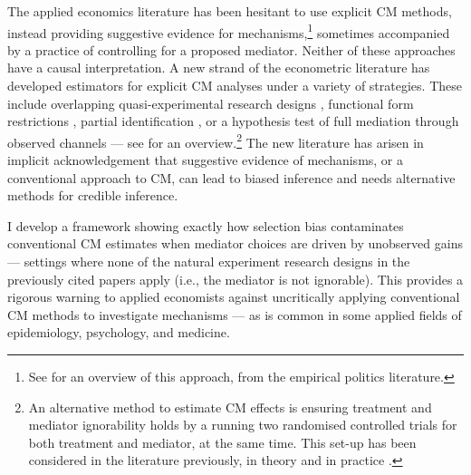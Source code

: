 The applied economics literature has been hesitant to use explicit CM methods, instead providing suggestive evidence for mechanisms,\footnote{
    See \cite{blackwell2024assumption} for an overview of this approach, from the empirical politics literature.
} sometimes accompanied by a practice of controlling for a proposed mediator.
Neither of these approaches have a causal interpretation.
A new strand of the econometric literature has developed estimators for explicit CM analyses under a variety of strategies.
These include overlapping quasi-experimental research designs \citep{deuchert2019direct,frolich2017direct}, functional form restrictions \citep{heckman2015econometric,heckman2013understanding}, partial identification \citep{flores2009identification}, or a hypothesis test of full mediation through observed channels \citep{kwon2024testing} --- see \cite{huber2019review} for an overview.\footnote{
    An alternative method to estimate CM effects is ensuring treatment and mediator ignorability holds by a running two randomised controlled trials for both treatment and mediator, at the same time.
    This set-up has been considered in the literature previously, in theory \citep{imai2013experimental} and in practice \citep{ludwig2011mechanism}.
}
The new literature has arisen in implicit acknowledgement that suggestive evidence of mechanisms, or a conventional approach to CM, can lead to biased inference and needs alternative methods for credible inference.

I develop a framework showing exactly how selection bias contaminates conventional CM estimates when mediator choices are driven by unobserved gains --- settings where none of the natural experiment research designs in the previously cited papers apply (i.e., the mediator is not ignorable).
This provides a rigorous warning to applied economists against uncritically applying conventional CM methods to investigate mechanisms --- as is common in some applied fields of epidemiology, psychology, and medicine.

